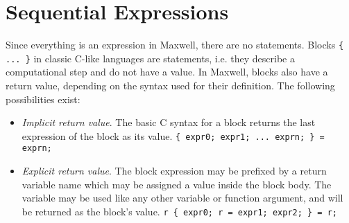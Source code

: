 \section{Sequential Expressions}

Since everything is an expression in Maxwell, there are no statements. Blocks \lstinline|{ ... }| in classic C-like languages are statements, i.e. they describe a computational step and do not have a value. In Maxwell, blocks also have a return value, depending on the syntax used for their definition. The following possibilities exist:

\begin{itemize}
\item \emph{Implicit return value}. The basic C syntax for a block returns the last expression of the block as its value. \lstinline|{ expr0; expr1; ... exprn; } = exprn;|
\item \emph{Explicit return value}. The block expression may be prefixed by a return variable name which may be assigned a value inside the block body. The variable may be used like any other variable or function argument, and will be returned as the block's value. \lstinline|r { expr0; r = expr1; expr2; } = r;|
\end{itemize}
